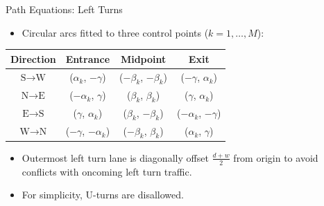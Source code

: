 
\begin{frame}{Path Equations: Left Turns}
\begin{itemize}
\item Circular arcs fitted to three control points ($k = 1,\dots,M$):
\end{itemize}
	\begin{center}
	\begin{tabular}{c|c c c}
	Direction & Entrance & Midpoint & Exit \\
	\hline
	$\text{S} \to \text{W}$ & ($\alpha_k$, $-\gamma$) & ($-\beta_k$, $-\beta_k$) & ($-\gamma$, $\alpha_k$) \\
	$\text{N} \to \text{E}$ & ($-\alpha_k$, $\gamma$) & ($\beta_k$, $\beta_k$) & ($\gamma$, $\alpha_k$) \\
	$\text{E} \to \text{S}$ & ($\gamma$, $\alpha_k$) & ($\beta_k$, $-\beta_k$) & ($-\alpha_k$, $-\gamma$) \\
	$\text{W} \to \text{N}$ & ($-\gamma$, $-\alpha_k$) & ($-\beta_k$, $\beta_k$) & ($\alpha_k$, $\gamma$) \\
	\end{tabular}
	\end{center}
\begin{itemize}
\item Outermost left turn lane is diagonally offset $\frac{d + w}{2}$ from
origin to avoid conflicts with oncoming left turn traffic.
\item For simplicity, U-turns are disallowed.
\end{itemize}
\end{frame}


